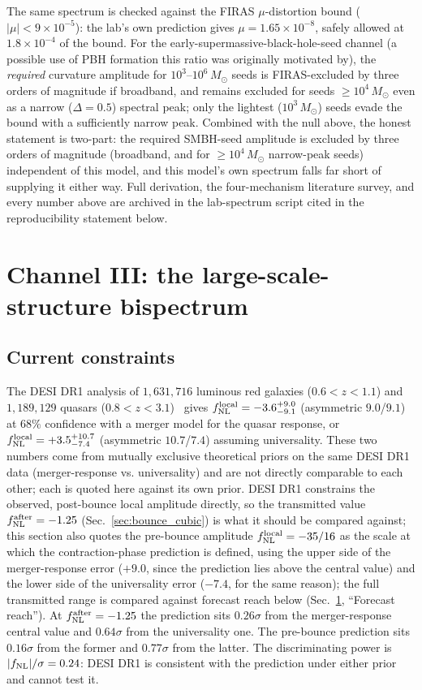 \documentclass[aps,prd,twocolumn,superscriptaddress,nofootinbib,longbibliography]{revtex4-2}
\newcommand{\fnl}{f_{\rm NL}}
\newcommand{\fnlloc}{f_{\rm NL}^{\rm local}}
\begin{document}
The same spectrum is checked against the FIRAS $\mu$-distortion bound
($|\mu|<9\times10^{-5}$): the lab's own prediction gives
$\mu=1.65\times10^{-8}$, safely allowed at $1.8\times10^{-4}$ of the bound.
For the early-supermassive-black-hole-seed channel (a possible use of PBH
formation this ratio was originally motivated by), the \emph{required}
curvature amplitude for $10^3$--$10^6\,M_\odot$ seeds is FIRAS-excluded by
three orders of magnitude if broadband, and remains excluded for seeds
$\ge10^4\,M_\odot$ even as a narrow ($\Delta=0.5$) spectral peak; only the
lightest ($10^3\,M_\odot$) seeds evade the bound with a sufficiently narrow
peak. Combined with the null above, the honest statement is two-part: the
required SMBH-seed amplitude is excluded by three orders of magnitude
(broadband, and for $\ge10^4\,M_\odot$ narrow-peak seeds) independent of
this model, and this model's own spectrum falls far short of supplying it
either way.
Full derivation, the four-mechanism literature survey, and every number
above are archived in the lab-spectrum script cited in the reproducibility
statement below.

\section{Channel III: the large-scale-structure bispectrum}
\label{sec:lss}

\subsection{Current constraints}

The DESI DR1 analysis of $1{,}631{,}716$ luminous red galaxies
($0.6<z<1.1$) and $1{,}189{,}129$ quasars
($0.8<z<3.1$)~\cite{Chaussidon2024} gives
$\fnlloc = -3.6^{+9.0}_{-9.1}$ (asymmetric $9.0$/$9.1$) at $68\%$ confidence
with a merger model for the quasar response, or
$\fnlloc = +3.5^{+10.7}_{-7.4}$ (asymmetric $10.7$/$7.4$) assuming universality.
These two numbers come from mutually exclusive theoretical priors on the same
DESI DR1 data (merger-response vs. universality) and are not directly
comparable to each other; each is quoted here against its own prior. DESI
DR1 constrains the observed, post-bounce local amplitude directly, so the
transmitted value $\fnl^{\rm after}=-1.25$ (Sec.~\ref{sec:bounce_cubic}) is
what it should be compared against; this section also quotes the
pre-bounce amplitude $\fnlloc=-35/16$ as the scale at which the
contraction-phase prediction is defined, using the upper
side of the merger-response error ($+9.0$, since the prediction lies above
the central value) and the lower side of the universality error ($-7.4$,
for the same reason); the full transmitted range is compared
against forecast reach below (Sec.~\ref{sec:lss}, ``Forecast reach''). At
$\fnl^{\rm after}=-1.25$ the prediction sits $0.26\sigma$ from the
merger-response central value and $0.64\sigma$ from the universality one.
The pre-bounce prediction sits $0.16\sigma$ from the former and
$0.77\sigma$ from the latter. The discriminating power is
$|\fnl|/\sigma = 0.24$: DESI DR1 is consistent with the prediction under
either prior and cannot test it.
\end{document}
